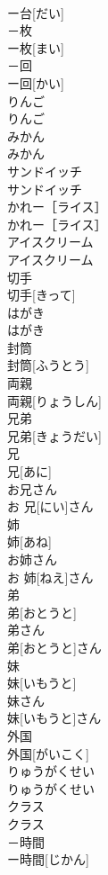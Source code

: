 \documentclass[8pt]{extreport}
\begin{document}
\begin{CJK}{UTF8}{min}
\\	ー台[だい]	
\\	－枚	
\\	ー枚[まい]	
\\	－回	
\\	ー回[かい]	
\\	りんご	
\\	りんご	
\\	みかん	
\\	みかん	
\\	サンドイッチ	
\\	サンドイッチ	
\\	かれー［ライス］	
\\	かれー［ライス］	
\\	アイスクリーム	
\\	アイスクリーム	
\\	切手	
\\	切手[きって]	
\\	はがき	
\\	はがき	
\\	封筒	
\\	封筒[ふうとう]	
\\	両親	
\\	両親[りょうしん]	
\\	兄弟	
\\	兄弟[きょうだい]	
\\	兄	
\\	兄[あに]	
\\	お兄さん	
\\	お 兄[にい]さん	
\\	姉	
\\	姉[あね]	
\\	お姉さん	
\\	お 姉[ねえ]さん	
\\	弟	
\\	弟[おとうと]	
\\	弟さん	
\\	弟[おとうと]さん	
\\	妹	
\\	妹[いもうと]	
\\	妹さん	
\\	妹[いもうと]さん	
\\	外国	
\\	外国[がいこく]	
\\	りゅうがくせい	
\\	りゅうがくせい	
\\	クラス	
\\	クラス	
\\	－時間	
\\	ー時間[じかん]	

\end{CJK}
\end{document}
